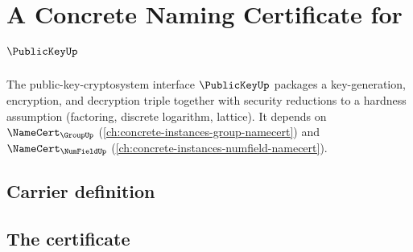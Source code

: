 \chapter{A Concrete Naming Certificate for $\PublicKeyUp$}
\label{ch:concrete-instances-publickey-namecert}

The public-key-cryptosystem interface $\PublicKeyUp$ packages a key-generation, encryption, and decryption triple together with security reductions to a hardness assumption (factoring, discrete logarithm, lattice). It depends on $\NameCert_{\GroupUp}$ (\autoref{ch:concrete-instances-group-namecert}) and $\NameCert_{\NumFieldUp}$ (\autoref{ch:concrete-instances-numfield-namecert}).

\section{Carrier definition}
\label{sec:publickey-carrier}

\section{The certificate}
\label{sec:publickey-certificate}

